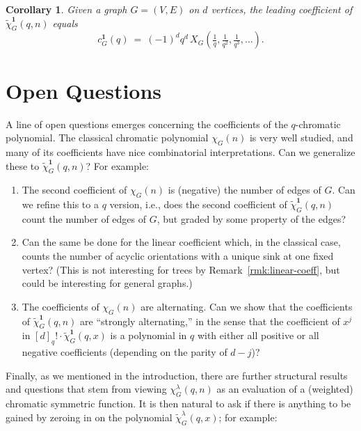 \documentclass[11pt]{amsart}
\newtheorem{corollary}[theorem]{Corollary}
\newcommand\bone{\mathbf{1}}
\begin{document}
\begin{corollary}\label{cor:leadingtostable}
Given a graph $G=(V,E)$ on $d$ vertices, the leading coefficient of $\widetilde\chi^\bone_G(q,n)$ equals
\[
  c^{ \bone }_G (q) \ = \ (-1)^d q^d \, X_G \left( \tfrac 1 q, \tfrac{ 1 }{ q^2 }, \tfrac{
1 }{ q^3 }, \dots \right) .
\]
\end{corollary}


\section{Open Questions}

A line of open questions emerges concerning the coefficients of the $q$-chromatic polynomial. The classical chromatic polynomial $\chi_G(n)$ is very well studied, and many of its coefficients have nice combinatorial interpretations. Can we generalize these to $\widetilde{\chi}^\bone_G(q,n)$? For example:

\begin{enumerate}
\item The second coefficient of $\chi_G(n)$ is (negative) the number of edges of $G$. Can we refine this to a $q$ version, i.e., does the second coefficient of $\widetilde{\chi}^\bone_G(q,n)$ count the number of edges of $G$, but graded by some property of the edges?
\item Can the same be done for the linear coefficient which, in the classical case, counts the number of acyclic orientations with a unique sink at one fixed vertex? (This is not interesting for trees by Remark~\ref{rmk:linear-coeff}, but could be interesting for general graphs.)
\item The coefficients of $\chi_G(n)$ are alternating. Can we show that the coefficients of $\widetilde{\chi}^\bone_G(q,n)$ are ``strongly alternating,'' in the sense that the coefficient of $x^j$ in $[d]_q!\cdot \widetilde{\chi}^\bone_G(q,x)$ is a polynomial in $q$ with either all positive or all negative coefficients (depending on the parity of $d-j$)?
\end{enumerate}

Finally, as we mentioned in the introduction, there are further structural results
and questions that stem from viewing $\chi_G^\lambda(q,n)$ as an evaluation of a (weighted) chromatic symmetric function. 
It is then natural to ask if there is anything to be gained by zeroing in on the polynomial $\widetilde{\chi}^\lambda_G(q,x)$; for example:
\end{document}
